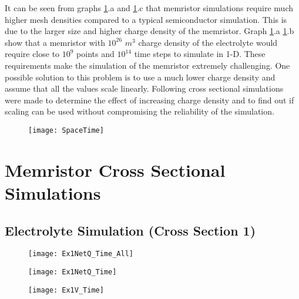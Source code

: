 It can be seen from graphs \ref{SpaceTime}.a and \ref{SpaceTime}.c that memristor simulations require much higher mesh densities compared to a typical semiconductor simulation. This is due to the larger size and higher charge density of the memristor. Graph \ref{SpaceTime}.a \ref{SpaceTime}.b show that a memristor with $10^{26}$ $m^{3}$ charge density of the electrolyte would require close to $10^9$ points and $10^{14}$ time steps to simulate in 1-D. These requirements make the simulation of the memristor extremely challenging. One possible solution to this problem is to use a much lower charge density and assume that all the values scale linearly. Following cross sectional simulations were made to determine the effect of increasing charge density and to find out if scaling can be used without compromising the reliability of the simulation.

\begin{landscape}
\begin{figure}[htp]
\centering
\texttt{[image: SpaceTime]}
\caption{} 
\label{SpaceTime}
\end{figure}
\end{landscape}

\clearpage
\section{Memristor Cross Sectional Simulations}

\subsection{Electrolyte Simulation (Cross Section 1)}


\begin{figure}[!htp]
\centering
\texttt{[image: Ex1NetQ\_Time\_All]}
\caption{} 
\label{}
\end{figure}



\begin{landscape}
\begin{figure}[!htp]
\centering
\texttt{[image: Ex1NetQ\_Time]}
\caption{} 
\label{}
\end{figure}
\end{landscape}

\begin{landscape}
\begin{figure}[!htp]
\centering
\texttt{[image: Ex1V\_Time]}
\caption{} 
\label{}
\end{figure}
\end{landscape}

